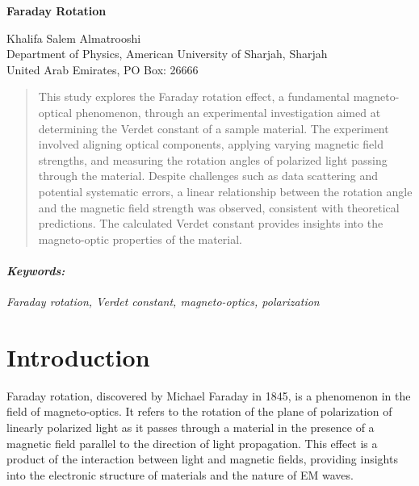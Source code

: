 \documentclass[11pt]{article}
\begin{document}
	\begin{titlepage}
		\begin{center}
			\begin{Large}
				\textbf{Faraday Rotation} \\
			\end{Large}
			\vspace{0.5cm}
			Khalifa Salem Almatrooshi \\
			\vspace{0.5cm}
			Department of Physics, American University of Sharjah, Sharjah \\
			United Arab Emirates, PO Box: 26666
		\end{center}
		\begin{abstract}
			\noindent
			This study explores the Faraday rotation effect, a fundamental magneto-optical phenomenon, through an experimental investigation aimed at determining the Verdet constant of a sample material. The experiment involved aligning optical components, applying varying magnetic field strengths, and measuring the rotation angles of polarized light passing through the material. Despite challenges such as data scattering and potential systematic errors, a linear relationship between the rotation angle and the magnetic field strength was observed, consistent with theoretical predictions. The calculated Verdet constant provides insights into the magneto-optic properties of the material.
		\end{abstract}
		\paragraph{\textit{Keywords:}} \textit{Faraday rotation, Verdet constant, magneto-optics, polarization}
	\end{titlepage}

\clearpage

	\section{Introduction}

	Faraday rotation, discovered by Michael Faraday in 1845, is a phenomenon in the field of magneto-optics. It refers to the rotation of the plane of polarization of linearly polarized light as it passes through a material in the presence of a magnetic field parallel to the direction of light propagation. This effect is a product of the interaction between light and magnetic fields, providing insights into the electronic structure of materials and the nature of EM waves.
\end{document}
